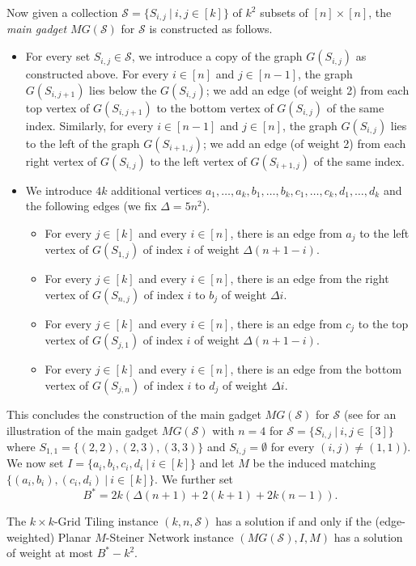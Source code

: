Now given a collection $\mathcal{S} = \{S_{i,j}~|~i,j \in [k]\}$ of $k^2$ subsets of $[n] \times [n]$, the \emph{main gadget $MG(\mathcal{S})$} for $\mathcal{S}$ is constructed as follows.
\begin{itemize}
\item For every set $S_{i,j} \in \mathcal{S}$, we introduce a copy of the graph $G(S_{i,j})$ as constructed above. For every $i \in [n]$ and $j \in [n-1]$, the graph $G(S_{i,j+1})$ lies below the $G(S_{i,j})$; we add an edge (of weight 2) from each top vertex of $G(S_{i,j+1})$ to the bottom vertex of $G(S_{i,j})$ of the same index. Similarly, for every $i \in [n-1]$ and $j \in [n]$, the graph $G(S_{i,j})$ lies to the left of the graph $G(S_{i+1,j})$; we add an edge (of weight 2) from each right vertex of $G(S_{i,j})$ to the left vertex of $G(S_{i+1,j})$ of the same index.
\item We introduce $4k$ additional vertices $a_1,\ldots,a_k,b_1,\ldots,b_k,c_1,\ldots,c_k,d_1,\ldots,d_k$ and the following edges (we fix $\Delta = 5n^2$).
\begin{itemize}
\item For every $j \in [k]$ and every $i \in [n]$, there is an edge from $a_j$ to the left vertex of $G(S_{1,j})$ of index $i$ of weight $\Delta(n+1-i)$.
\item For every $j \in [k]$ and every $i \in [n]$, there is an edge from the right vertex of $G(S_{n,j})$ of index $i$ to $b_j$ of weight $\Delta i$.
\item For every $j \in [k]$ and every $i \in [n]$, there is an edge from $c_j$ to the top vertex of $G(S_{j,1})$ of index $i$ of weight $\Delta(n+1-i)$.
\item For every $j \in [k]$ and every $i \in [n]$, there is an edge from the bottom vertex of $G(S_{j,n})$ of index $i$ to $d_j$ of weight $\Delta i$.
\end{itemize}
\end{itemize}
This concludes the construction of the main gadget $MG(\mathcal{S})$ for $\mathcal{S}$ (see  for an illustration of the main gadget $MG(\mathcal{S})$ with $n=4$ for $\mathcal{S} = \{S_{i,j}~|~i,j \in [3]\}$ where $S_{1,1} =\{(2,2),(2,3),(3,3)\}$ and $S_{i,j} = \emptyset$ for every $(i,j) \neq (1,1)$). We now set $I = \{a_i,b_i,c_i,d_i~|~i \in [k]\}$ and let $M$ be the induced matching $\{(a_i,b_i),(c_i,d_i)~|~i\in [k]\}$. We further set
\[
B^* = 2k(\Delta(n+1) + 2(k+1) +2k(n-1)).
\]

\begin{lemma}
\label{lem:grid-dsn}
The {\sc $k \times k$-Grid Tiling} instance $(k,n,\mathcal{S})$ has a solution if and only if the (edge-weighted) {\sc Planar $M$-Steiner Network} instance $(MG(\mathcal{S}),I,M)$ has a solution of weight at most $B^*-k^2$.
\end{lemma}

